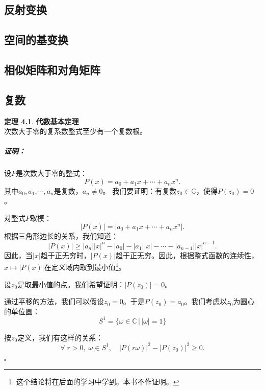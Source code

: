 \documentclass[12pt,UTF8]{ctexbook}
\theoremstyle{definition}
\newtheorem{tm}{定理}[section]
\theoremstyle{plain}
\renewenvironment{proof}{\paragraph{\textbf{证明：}}}{\hfill$\square$}
\begin{document}
\section{反射变换}

\section{空间的基变换}

\section{相似矩阵和对角矩阵}

\begin{appendix}

\chapter{复数}

\begin{tm}{\textbf{代数基本定理}}
    \mbox{} \\
    次数大于零的复系数整式至少有一个复数根。
\end{tm}

\begin{proof}
    设$P$是次数大于零的整式：
    $$ P(x) = a_0 + a_1 x + \cdots + a_n x^n.$$
    其中$a_0, a_1, \cdots , a_n$是复数，$a_n \neq 0$。
    我们要证明：有复数$z_0\in\mathbb{C}$，使得$P(z_0) = 0$。

    对整式$P$取模：
    $$ |P(x)| = |a_0 + a_1 x + \cdots + a_n x^n|. $$
    根据三角形边长的关系，我们知道：
    $$ |P(x)| \geqslant |a_n| |x|^n - |a_0| - |a_1||x| - \cdots - |a_{n-1}| |x|^{n-1}. $$
    因此，当$|x|$趋于正无穷时，$|P(x)|$趋于正无穷。因此，根据整式函数的连续性，$x\mapsto |P(x)|$在定义域内取到最小值\footnote{这个结论将在后面的学习中学到。本书不作证明。}。

    设$z_0$是取最小值的点。我们希望证明：$|P(z_0)| = 0$。
    
    通过平移的方法，我们可以假设$z_0 = 0$。于是$P(z_0) = a_0$。我们考虑以$z_0$为圆心的单位圆：
    $$ S^1 = \{\omega\in\mathbb{C} \, | \, |\omega| = 1\}$$

    按$z_0$定义，我们有这样的关系：
    $$ \forall \; r > 0, \; \omega \in S^1,\quad  |P(r\omega)|^2 - |P(z_0)|^2 \geqslant 0. $$ 


\end{proof}
\end{appendix}
\end{document}
